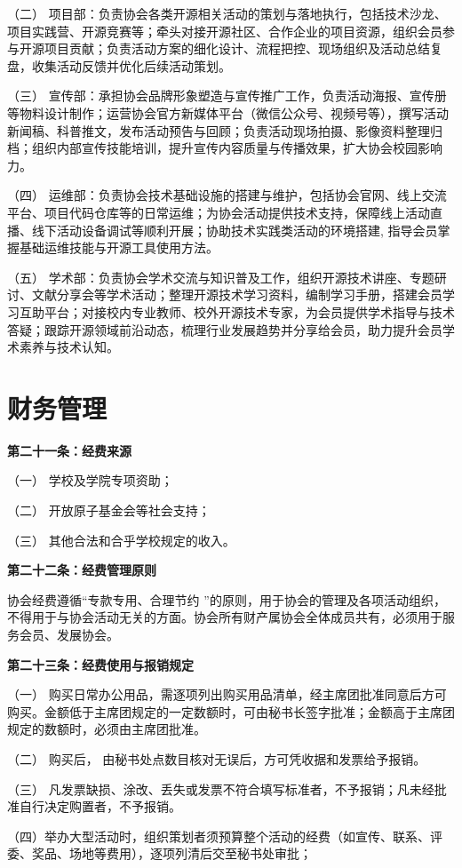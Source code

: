 \documentclass{mjsart}
\begin{document}
（二） 项目部：负责协会各类开源相关活动的策划与落地执行，包括技术沙龙、项目实践营、开源竞赛等；牵头对接开源社区、合作企业的项目资源，组织会员参与开源项目贡献；负责活动方案的细化设计、流程把控、现场组织及活动总结复盘，收集活动反馈并优化后续活动策划。

（三） 宣传部：承担协会品牌形象塑造与宣传推广工作，负责活动海报、宣传册等物料设计制作；运营协会官方新媒体平台（微信公众号、视频号等），撰写活动新闻稿、科普推文，发布活动预告与回顾；负责活动现场拍摄、影像资料整理归档；组织内部宣传技能培训，提升宣传内容质量与传播效果，扩大协会校园影响力。

（四） 运维部：负责协会技术基础设施的搭建与维护，包括协会官网、线上交流平台、项目代码仓库等的日常运维；为协会活动提供技术支持，保障线上活动直播、线下活动设备调试等顺利开展；协助技术实践类活动的环境搭建, 指导会员掌握基础运维技能与开源工具使用方法。

（五） 学术部：负责协会学术交流与知识普及工作，组织开源技术讲座、专题研讨、文献分享会等学术活动；整理开源技术学习资料，编制学习手册，搭建会员学习互助平台；对接校内专业教师、校外开源技术专家，为会员提供学术指导与技术答疑；跟踪开源领域前沿动态，梳理行业发展趋势并分享给会员，助力提升会员学术素养与技术认知。

\section{财务管理}

\textbf{第二十一条：经费来源}

（一） 学校及学院专项资助；

（二） 开放原子基金会等社会支持；

（三） 其他合法和合乎学校规定的收入。

\textbf{第二十二条：经费管理原则}

协会经费遵循“专款专用、合理节约 ”的原则，用于协会的管理及各项活动组织，不得用于与协会活动无关的方面。协会所有财产属协会全体成员共有，必须用于服务会员、发展协会。

\textbf{第二十三条：经费使用与报销规定}

（一） 购买日常办公用品，需逐项列出购买用品清单，经主席团批准同意后方可购买。金额低于主席团规定的一定数额时，可由秘书长签字批准；金额高于主席团规定的数额时，必须由主席团批准。

（二） 购买后， 由秘书处点数目核对无误后，方可凭收据和发票给予报销。

（三） 凡发票缺损、涂改、丢失或发票不符合填写标准者，不予报销；凡未经批准自行决定购置者，不予报销。

（四）举办大型活动时，组织策划者须预算整个活动的经费（如宣传、联系、评委、奖品、场地等费用），逐项列清后交至秘书处审批；
\end{document}
